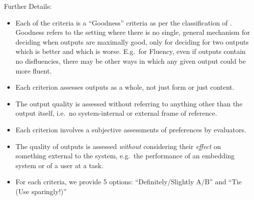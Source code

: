 \documentclass{article}
\theoremstyle{definition}
\begin{document}
Further Details:
\begin{itemize}[itemsep=0cm,leftmargin=0.5cm]
\item Each of the criteria is a ``{Goodness}'' criteria as per the classification of \cite{belz2020disentangling}. Goodness refers to the setting where there is no single, general mechanism for deciding when outputs are maximally good, only for deciding for two outputs which is better and which is worse. E.g.\ for Fluency, even if outputs contain no disfluencies, there may be other ways in which any given output could be more fluent.
\item Each criterion assesses outputs as a whole, not just form or just content.
\item The output quality is assessed without referring to anything other than the output itself, i.e.\ no  system-internal or external frame of reference. 
\item Each criterion involves a subjective assessments of preferences by evaluators.
\item The quality of outputs is assessed \textit{without} considering their \textit{effect} on something external to the system, e.g.\ the performance of an embedding system or of a user at a task.
%
%
%
\item For each criteria, we provide 5 options: ``Definitely/Slightly A/B'' and ``Tie (Use sparingly!)''
\end{itemize}
\end{document}
